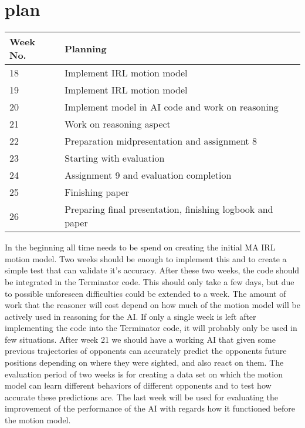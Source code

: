 \documentclass[a4paper, 12pt]{article}
\begin{document}
\section{plan}
\begin{table}
\centering
    \begin{tabular}{| l | l |}
      \hline                        
      Week No. & Planning \\
      \hline
      \hline
      18 &  Implement IRL motion model \\
      \hline
      19 &  Implement IRL motion model \\
      \hline
      20 &  Implement model in AI code and work on reasoning\\
      \hline
      21 &  Work on reasoning aspect \\
      \hline
      22 &  Preparation midpresentation and assignment 8\\
      \hline
      23 &  Starting with evaluation\\
      \hline
      24 &  Assignment 9 and evaluation completion \\
      \hline
      25 &  Finishing paper \\
      \hline
      26 &  Preparing final presentation, finishing logbook and paper \\
      \hline
    \end{tabular}
\end{table}
In the beginning all time needs to be spend on creating the initial MA IRL
motion model. Two weeks should be enough to implement this and to create a
simple test that can validate it's accuracy. After these two weeks, the code
should be integrated in the Terminator code. This should only take a few days,
but due to possible unforeseen difficulties could be extended to a week. The
amount of work that the reasoner will cost depend on how much of the motion
model will be actively used in reasoning for the AI. If only a single week is
left after implementing the code into the Terminator code, it will probably only
be used in few situations. After week 21 we should have a working AI that given
some previous trajectories of opponents can accurately predict the opponents
future positions depending on where they were sighted, and also react on them.
The evaluation period of two weeks is for creating a data set on which the
motion model can learn different behaviors of different opponents and to test
how accurate these predictions are. The last week will be used for evaluating
the improvement of the performance of the AI with regards how it functioned
before the motion model.




\end{document}
